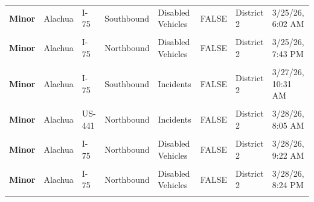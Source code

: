 \documentclass[
]{article}
\begin{document}
\begin{longtable}[t]{>{\raggedright\arraybackslash}p{1.5cm}>{\raggedright\arraybackslash}p{2.5cm}>{\raggedright\arraybackslash}p{3cm}>{\raggedright\arraybackslash}p{1.8cm}>{\raggedright\arraybackslash}p{2.5cm}lll}
\addlinespace
\textbf{Minor} & Alachua & I-75 & Southbound & Disabled Vehicles & FALSE & District 2 & 3/25/26, 6:02 AM\\
\textbf{\cellcolor{gray!10}{Minor}} & \cellcolor{gray!10}{Alachua} & \cellcolor{gray!10}{I-75} & \cellcolor{gray!10}{Northbound} & \cellcolor{gray!10}{Disabled Vehicles} & \cellcolor{gray!10}{FALSE} & \cellcolor{gray!10}{District 2} & \cellcolor{gray!10}{3/25/26, 12:25 PM}\\
\textbf{Minor} & Alachua & I-75 & Northbound & Disabled Vehicles & FALSE & District 2 & 3/25/26, 7:43 PM\\
\textbf{\cellcolor{gray!10}{Minor}} & \cellcolor{gray!10}{Alachua} & \cellcolor{gray!10}{I-75} & \cellcolor{gray!10}{Southbound} & \cellcolor{gray!10}{Disabled Vehicles} & \cellcolor{gray!10}{FALSE} & \cellcolor{gray!10}{District 2} & \cellcolor{gray!10}{3/27/26, 6:21 AM}\\
\textbf{Minor} & Alachua & I-75 & Southbound & Incidents & FALSE & District 2 & 3/27/26, 10:31 AM\\
\addlinespace
\textbf{\cellcolor{gray!10}{Minor}} & \cellcolor{gray!10}{Alachua} & \cellcolor{gray!10}{I-75} & \cellcolor{gray!10}{Northbound} & \cellcolor{gray!10}{Disabled Vehicles} & \cellcolor{gray!10}{FALSE} & \cellcolor{gray!10}{District 2} & \cellcolor{gray!10}{3/27/26, 9:25 PM}\\
\textbf{Minor} & Alachua & US-441 & Northbound & Incidents & FALSE & District 2 & 3/28/26, 8:05 AM\\
\textbf{\cellcolor{gray!10}{Minor}} & \cellcolor{gray!10}{Alachua} & \cellcolor{gray!10}{I-75} & \cellcolor{gray!10}{Southbound} & \cellcolor{gray!10}{Disabled Vehicles} & \cellcolor{gray!10}{FALSE} & \cellcolor{gray!10}{District 2} & \cellcolor{gray!10}{3/28/26, 7:12 AM}\\
\textbf{Minor} & Alachua & I-75 & Northbound & Disabled Vehicles & FALSE & District 2 & 3/28/26, 9:22 AM\\
\textbf{\cellcolor{gray!10}{Minor}} & \cellcolor{gray!10}{Alachua} & \cellcolor{gray!10}{I-75} & \cellcolor{gray!10}{Northbound} & \cellcolor{gray!10}{Disabled Vehicles} & \cellcolor{gray!10}{FALSE} & \cellcolor{gray!10}{District 2} & \cellcolor{gray!10}{3/28/26, 8:19 PM}\\
\addlinespace
\textbf{Minor} & Alachua & I-75 & Northbound & Disabled Vehicles & FALSE & District 2 & 3/28/26, 8:24 PM\\
\textbf{\cellcolor{gray!10}{Minor}} & \cellcolor{gray!10}{Alachua} & \cellcolor{gray!10}{I-75} & \cellcolor{gray!10}{Northbound} & \cellcolor{gray!10}{Incidents} & \cellcolor{gray!10}{FALSE} & \cellcolor{gray!10}{District 2} & \cellcolor{gray!10}{3/29/26, 5:16 AM}\\

\end{longtable}
\end{document}
